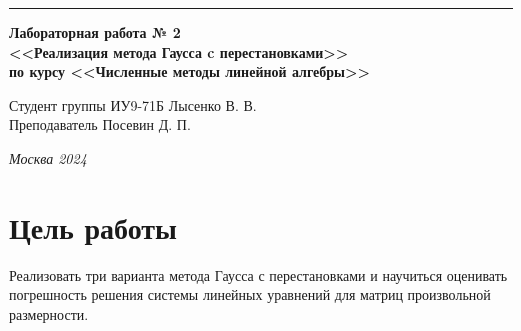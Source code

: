 \documentclass[a4paper, 14pt]{extarticle}
\begin{document}
\begin{titlepage}
\vspace*{-16pt}
\hspace{30pt}\rule{0.866\textwidth}{0.4pt}
  
\vspace{11em}

\begin{center}
\Large {\bf Лабораторная работа № 2} \\ 
\large {\bf<<Реализация метода Гаусса c перестановками>>} \\ 
\large {\bf по курсу <<Численные методы линейной алгебры>>} \\ 
\end{center}\normalsize

\vspace{8em}


\begin{flushright}
  {Студент группы ИУ9-71Б Лысенко В. В.\hspace*{15pt} \\
  \vspace{2ex}
  Преподаватель Посевин Д. П.\hspace*{15pt}}
\end{flushright}

\bigskip

\vfill
 

\begin{center}
\textsl{Москва 2024}
\end{center}
\end{titlepage}

\renewcommand{\ttdefault}{pcr}

\setlength{\tabcolsep}{3pt}
\newpage
\setcounter{page}{2}

\section{Цель работы}\label{Sect::task}
\par
\renewcommand{\labelenumii}{\arabic{enumi}.\arabic{enumii}.}
Реализовать три варианта метода Гаусса с перестановками и научиться оценивать погрешность решения системы линейных уравнений для матриц произвольной размерности.
\end{document}
